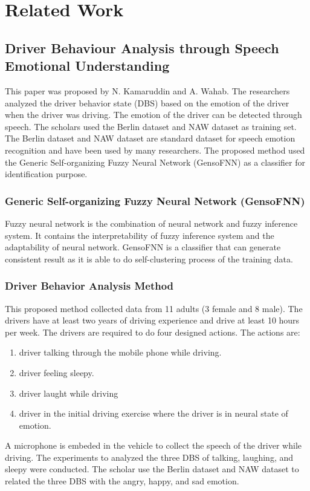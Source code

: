 \chapter{Related Work}
\section{Driver Behaviour Analysis through Speech Emotional Understanding}
This paper was proposed by N. Kamaruddin and A. Wahab. The researchers analyzed the driver behavior state (DBS) based on the emotion of the driver when the driver was driving. The emotion of the driver can be detected through speech. 
The scholars used the Berlin dataset and NAW dataset as training set. The Berlin dataset and NAW dataset are standard dataset for speech emotion recognition and have been used by many researchers.
The proposed method used the Generic Self-organizing Fuzzy Neural Network (GensoFNN) as a classifier for identification purpose. 
\subsection{Generic Self-organizing Fuzzy Neural Network (GensoFNN)}
Fuzzy neural network is the combination of neural network and fuzzy inference system. It contains the interpretability of fuzzy inference system and the adaptability of neural network. GensoFNN is a classifier that can generate consistent result as it is able to do self-clustering process of the training data.
\subsection{Driver Behavior Analysis Method}
This proposed method collected data from 11 adults (3 female and 8 male). The drivers have at least two years of driving experience and drive at least 10 hours per week. The drivers are required to do four designed actions. The actions are: 
\begin{enumerate}
\item driver talking through the mobile phone while driving.
\item driver feeling sleepy.
\item driver laught while driving
\item driver in the initial driving exercise where the driver is in neural state of emotion.
\end{enumerate}

A microphone is embeded in the vehicle to collect the speech of the driver while driving. The experiments to analyzed the three DBS of talking, laughing, and sleepy were conducted. The scholar use the Berlin dataset and NAW dataset to related the three DBS with the angry, happy, and sad emotion.

